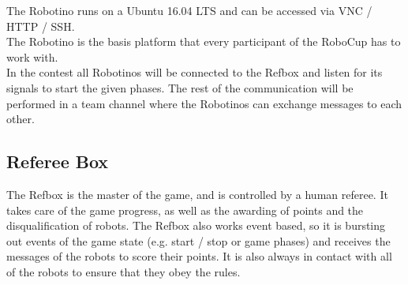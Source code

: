 The Robotino runs on a Ubuntu 16.04 LTS and can be accessed via VNC / HTTP / SSH.\\

The Robotino is the basis platform that every participant of the RoboCup has to work with.\\
In the contest all Robotinos will be connected to the Refbox and listen for its signals to start the given phases.
The rest of the communication will be performed in a team channel where the Robotinos can exchange messages to each other.

\subsection{Referee Box}
The Refbox is the master of the game, and is controlled by a human referee. It takes care of the game progress, as well as the awarding of points and the disqualification of robots.
The Refbox also works event based, so it is bursting out events of the game state (e.g. start / stop or game phases) and receives the messages of the robots to score their points.
It is also always in contact with all of the robots to ensure that they obey the rules.
